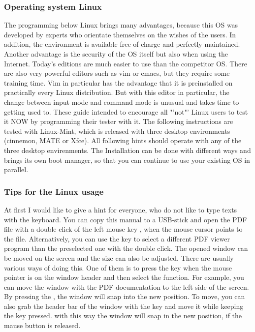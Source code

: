 \subsubsection{Operating system Linux}

The programming below Linux brings many advantages, because this OS was developed by experts
who orientate themselves on the wishes of the users.
In addition, the environment is available free of charge and perfectly maintained.
Another advantage is the security of the OS itself but also when using the Internet.
Today's editions are much easier to use than the competitor OS.
There are also very powerful editors such as vim or emacs, but they require some training time.
Vim in particular has the advantage that it is preinstalled on practically every Linux distribution.
But with this editor in particular, the change between input mode and command mode
is unusual and takes time to getting used to.
These guide intended to encourage all "'not"' Linux users to test it NOW
by programming their tester with it.
The following instructions are tested with Linux-Mint, which is released with
three desktop environments (cinnemon, MATE or Xfce).
All following hints should operate with any of the three desktop envirenments.
The Installation can be done with different ways and brings its own boot manager,
so that you can continue to use your existing OS in parallel. 

\subsubsection{Tips for the Linux usage}

At first I would like to give a hint for everyone, who do not like to
type texts with the keyboard.
You can copy this manual to a USB-stick and open the PDF file with a double click
of the left mouse key \LMB,
when the mouse cursor points to the file.
Alternatively, you can use the \RMB key to select a different PDF viewer program
than the preselected one with the double click.
The opened window can be moved on the screen and the size can also be adjusted.
There are usually various ways of doing this.
One of them is to press the \RMB key when the mouse pointer is on the window header and
then select the  function.
For example, you can move the window with the PDF documentation to the left side of the screen.
By pressing the \LMB, the window will snap into the new position. 
To move, you can also grab the header bar of the window with the \LMB key and move it
while keeping the \LMB key pressed.
with this way the window will snap in the new position, if the mause button is released.

